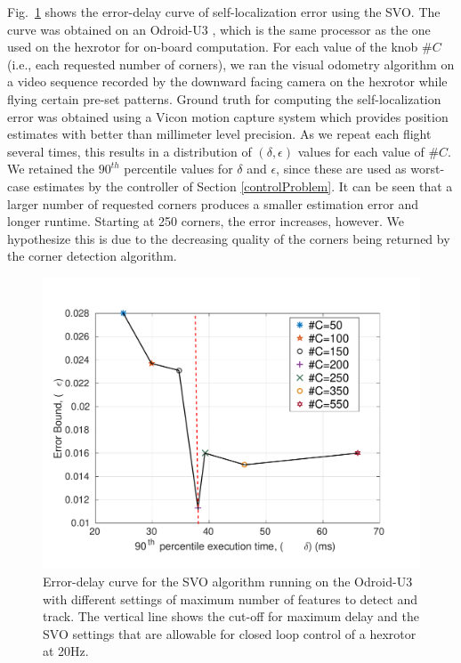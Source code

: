 Fig.~\ref{fig:svo_error_delay} shows the error-delay curve of self-localization error using the SVO.
The curve was obtained on an Odroid-U3 \cite{Odroid}, which is the same processor as the one used on the hexrotor for on-board computation.
For each value of the knob $\#C$ (i.e., each requested number of corners), we ran the visual odometry algorithm on a video sequence recorded by the downward facing camera on the hexrotor while flying certain pre-set patterns.
Ground truth for computing the self-localization error was obtained using a Vicon motion capture system which provides position estimates with better than millimeter level precision.
As we repeat each flight several times, this results in a distribution of $(\delta,\epsilon)$ values for each value of $\#C$.
We retained the $90^{th}$ percentile values for $\delta$ and $\epsilon$, since these are used as worst-case estimates by the controller of Section \ref{controlProblem}.
It can be seen that a larger number of requested corners produces a smaller estimation error and longer runtime.
Starting at 250 corners, the error increases, however.
We hypothesize this is due to the decreasing quality of the corners being returned by the corner detection algorithm.
\begin{figure}[t]
\centering
\includegraphics[width=0.99\columnwidth]{figures/errVsTime}
\caption{Error-delay curve for the SVO algorithm running on the Odroid-U3 with different settings of maximum number of features to detect and track. The vertical line shows the cut-off for maximum delay and the SVO settings that are allowable for closed loop control of a hexrotor at 20Hz.}
\label{fig:svo_error_delay}
\end{figure}

